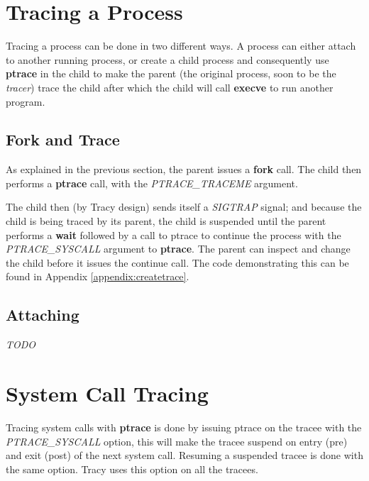\documentclass[a4paper, 10pt]{report}
\begin{document}
\section{Tracing a Process}

Tracing a process can be done in two different ways. A process can either attach
to another running process, or create a child process and consequently use
\textbf{ptrace} in the child to make the parent (the original process, soon to
be the \textit{tracer}) trace the child after which the child will
call \textbf{execve} to run another program.

\subsection{Fork and Trace}

As explained in the previous section, the parent issues a \textbf{fork} call.
The child then performs a \textbf{ptrace} call, with the \textit{PTRACE\_TRACEME} argument.

The child then (by Tracy design)  sends itself a \textit{SIGTRAP} signal;
and because the child is being traced by its parent, the child is
suspended until the parent performs a \textbf{wait} followed by a call
to ptrace to continue the process with the \textit{PTRACE\_SYSCALL} argument
to \textbf{ptrace}.
The parent can inspect and change the child before it issues
the continue call. The code demonstrating this can be found in
Appendix \ref{appendix:createtrace}.

\subsection{Attaching}

\textit{TODO}


\section{System Call Tracing}
\label{syscall-trace}

Tracing system calls with \textbf{ptrace} is done by issuing ptrace on the
tracee with the \textit{PTRACE\_SYSCALL} option, this will make the tracee
suspend on entry (pre) and exit (post) of the next system call. Resuming a
suspended tracee is done with the same option. Tracy uses this option on
all the tracees.
\end{document}
